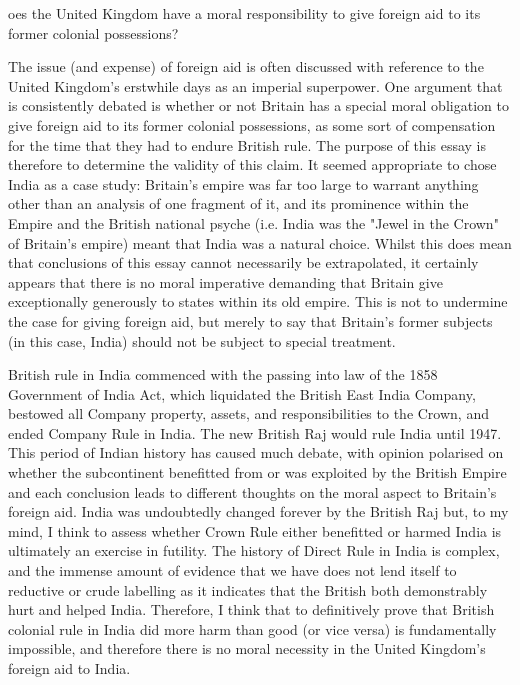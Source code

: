 \label{ch:the-moral-responsibility-in-foreign-aid}

oes the United Kingdom have a moral responsibility to give foreign aid to
its former colonial possessions?

   The issue (and expense) of foreign aid is often discussed with
   reference to the United Kingdom's erstwhile days as an imperial
   superpower.  One argument that is consistently debated is whether or
   not Britain has a special moral obligation to give foreign aid to its
   former colonial possessions, as some sort of compensation for the time
   that they had to endure British rule. The purpose of this essay is
   therefore to determine the validity of this claim. It seemed
   appropriate to chose India as a case study: Britain's empire was far
   too large to warrant anything other than an analysis of one fragment of
   it, and its prominence within the Empire and the British national
   psyche (i.e. India was the "Jewel in the Crown" of Britain's empire)
   meant that India was a natural choice.  Whilst this does mean that
   conclusions of this essay cannot necessarily be extrapolated, it
   certainly appears that there is no moral imperative demanding that
   Britain give exceptionally generously to states within its old empire.
   This is not to undermine the case for giving foreign aid, but merely to
   say that Britain's former subjects (in this case, India) should not be
   subject to special treatment.

   British rule in India commenced with the passing into law of the 1858
   Government of India Act, which liquidated the British East India
   Company, bestowed all Company property, assets, and responsibilities to
   the Crown, and ended Company Rule in India. The new British Raj would
   rule India until 1947. This period of Indian history has caused much
   debate, with opinion polarised on whether the subcontinent benefitted
   from or was exploited by the British Empire and each conclusion leads
   to different thoughts on the moral aspect to Britain's foreign aid.
   India was undoubtedly changed forever by the British Raj but, to my
   mind, I think to assess whether Crown Rule either benefitted or harmed
   India is ultimately an exercise in futility. The history of Direct Rule
   in India is complex, and the immense amount of evidence that we have
   does not lend itself to reductive or crude labelling as it indicates
   that the British both demonstrably hurt and helped India. Therefore, I
   think that to definitively prove that British colonial rule in India
   did more harm than good (or vice versa) is fundamentally impossible,
   and therefore there is no moral necessity in the United Kingdom's
   foreign aid to India.

